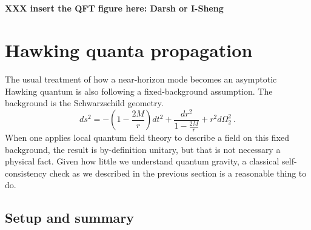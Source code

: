 \documentclass[aps,showpacs,twocolumn,floats,prd,superscriptaddress,nofootinbib]{revtex4-1}
\begin{document}
\ \\ \ \\
{\bf XXX insert the QFT figure here: Darsh or I-Sheng}


\section{Hawking quanta propagation}
\label{sec-BlackHole}

The usual treatment of how a near-horizon mode becomes an asymptotic Hawking quantum is also following a fixed-background assumption.
The background is the Schwarzschild geometry.
\begin{equation}
ds^2 = -\left(1-\frac{2M}{r}\right)dt^2 + \frac{dr^2}{1-\frac{2M}{r}} + r^2d\Omega_2^2~.
\end{equation}
When one applies local quantum field theory to describe a field on this fixed background, the result is by-definition unitary, but that is not necessary a physical fact. 
Given how little we understand quantum gravity, a classical self-consistency check as we described in the previous section is a reasonable thing to do.

\subsection{Setup and summary}
\end{document}
